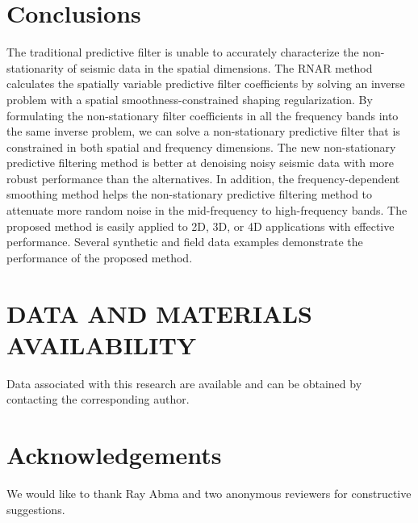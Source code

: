 


\section{Conclusions}
The traditional predictive filter is unable to accurately characterize the non-stationarity of seismic data in the spatial dimensions. 
The RNAR method calculates the spatially variable predictive filter coefficients by solving an inverse problem with a spatial smoothness-constrained shaping regularization. By formulating the non-stationary filter coefficients in all the frequency bands into the same inverse problem, we can solve a non-stationary predictive filter that is constrained in both spatial and frequency dimensions. The new non-stationary predictive filtering method is better at denoising noisy seismic data with more robust performance than the alternatives. In addition, the frequency-dependent smoothing method helps the non-stationary predictive filtering method to attenuate more random noise in the mid-frequency to high-frequency bands. The proposed method is easily applied to 2D, 3D, or 4D applications with effective performance. Several synthetic and field data examples demonstrate the  performance of the proposed method.


\section{DATA AND MATERIALS AVAILABILITY}
Data associated with this research are available and can be obtained by contacting the corresponding author.

\section{Acknowledgements}
We would like to thank Ray Abma and two anonymous reviewers for constructive suggestions. 








